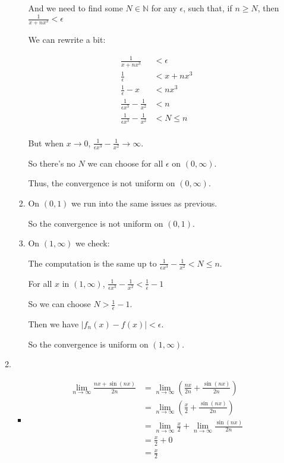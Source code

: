 \documentclass[12pt,letterpaper]{article}
\begin{document}
\begin{enumerate}
\begin{enumerate}
\begin{enumerate}
              And we need to find some $N \in \mathbb{N}$ for any $\epsilon$,
              such that, if $n \geq N$, then $\frac{1}{x + nx^3} < \epsilon$

              We can rewrite a bit:

              \begin{align*}
                \frac{1}{x + nx^3} &< \epsilon \\
                \frac{1}{\epsilon} &< x + nx^3 \\
                \frac{1}{\epsilon} - x &< nx^3 \\
                \frac{1}{\epsilon x^3} - \frac{1}{x^2} &< n \\
                \frac{1}{\epsilon x^3} - \frac{1}{x^2} &< N \leq n \\
              \end{align*}

              But when $x \to 0$, $\frac{1}{\epsilon x^3} - \frac{1}{x^2} \to \infty$.

              So there's no $N$ we can choose for all $\epsilon$ on $(0, \infty)$.

              Thus, the convergence is not uniform on $(0, \infty)$.
            \item
              On $(0, 1)$ we run into the same issues as previous.

              So the convergence is not uniform on $(0, 1)$.
            \item
              On $(1, \infty)$ we check:

              The computation is the same up to $\frac{1}{\epsilon x^3} - \frac{1}{x^2} < N \leq n$.

              For all $x$ in $(1, \infty)$, $\frac{1}{\epsilon x^3} - \frac{1}{x^2} < \frac{1}{\epsilon} - 1$

              So we can choose $N > \frac{1}{\epsilon} - 1$.

              Then we have $\left|f_n(x) - f(x)\right| < \epsilon$.

              So the convergence is uniform on $(1, \infty)$.

          \end{enumerate}
        \item
          \begin{itemize}
            \item
              \begin{align*}
                \lim_{n \to \infty} \frac{nx + \sin(nx)}{2n}
                &= \lim_{n \to \infty} \left(\frac{nx}{2n} + \frac{\sin(nx)}{2n}\right) \\
                &= \lim_{n \to \infty} \left(\frac{x}{2} + \frac{\sin(nx)}{2n}\right) \\
                &= \lim_{n \to \infty} \frac{x}{2} + \lim_{n \to \infty} \frac{\sin(nx)}{2n} \\
                &= \frac{x}{2} + 0 \\
                &= \frac{x}{2} \\
              \end{align*}


\end{itemize}
\end{enumerate}
\end{enumerate}
\end{document}
